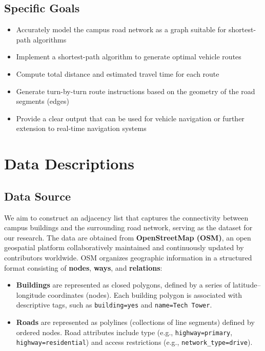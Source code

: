 \documentclass[fleqn,10pt]{olplainarticle}
\begin{document}
\subsection*{Specific Goals}
\begin{itemize}
    \item Accurately model the campus road network as a graph suitable for shortest-path algorithms
    \item Implement a shortest-path algorithm to generate optimal vehicle routes
    \item Compute total distance and estimated travel time for each route
    \item Generate turn-by-turn route instructions based on the geometry of the road segments (edges)
    \item Provide a clear output that can be used for vehicle navigation or further extension to real-time navigation systems
\end{itemize}

\section*{Data Descriptions}
\subsection*{Data Source}
We aim to construct an adjacency list that captures the connectivity between campus buildings and the surrounding road network, serving as the dataset for our research. The data are obtained from \textbf{OpenStreetMap (OSM)}, an open geospatial platform collaboratively maintained and continuously updated by contributors worldwide. OSM organizes geographic information in a structured format consisting of \textbf{nodes}, \textbf{ways}, and \textbf{relations}:
\begin{itemize}
    \item \textbf{Buildings} are represented as closed polygons, defined by a series of latitude–longitude coordinates (nodes). Each building polygon is associated with descriptive tags, such as \texttt{building=yes} and \texttt{name=Tech Tower}.

    \item \textbf{Roads} are represented as polylines (collections of line segments) defined by ordered nodes. Road attributes include type (e.g., \texttt{highway=primary}, \texttt{highway=residential}) and access restrictions (e.g., \texttt{network\_type=drive}).
\end{itemize}
\end{document}
